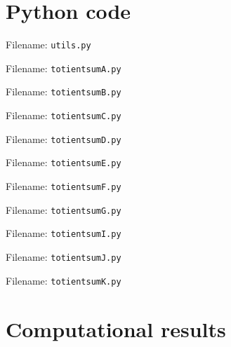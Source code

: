 \documentclass[12pt]{article}
\newcommand{\floor}[1]{{\left\lfloor #1 \right\rfloor}}
\newcommand{\showcode}[1]{Filename: \texttt{#1.py} }
\newcommand{\isqrt}[1]{\floor{\sqrt{#1}}}
\begin{document}
\section{Python code}


Filename: \texttt{utils.py}

Filename: \texttt{totientsumA.py}
%

Filename: \texttt{totientsumB.py}
%

Filename: \texttt{totientsumC.py}
%

Filename: \texttt{totientsumD.py}
%

Filename: \texttt{totientsumE.py}
%

Filename: \texttt{totientsumF.py}
%

Filename: \texttt{totientsumG.py}
%

Filename: \texttt{totientsumI.py}
%

Filename: \texttt{totientsumJ.py}
%

Filename: \texttt{totientsumK.py}
%

\section{Computational results}
\end{document}
